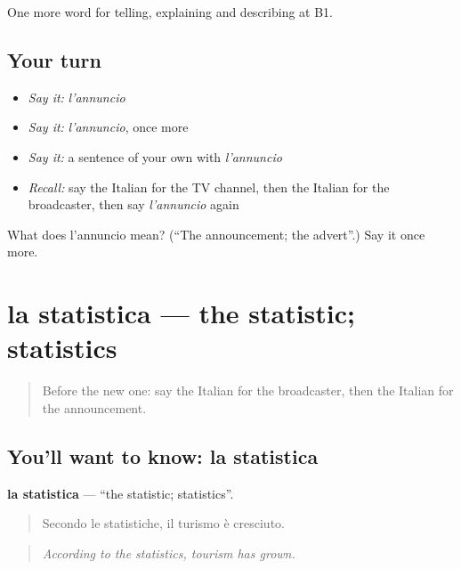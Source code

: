 \begin{grammarlens}[title={What you've built}]
One more word for telling, explaining and describing at B1.
\end{grammarlens}

\subsection*{Your turn}
\begin{itemize}
\raggedright
  \item \emph{Say it:} \emph{l'annuncio}
  \item \emph{Say it:} \emph{l'annuncio}, once more
  \item \emph{Say it:} a sentence of your own with \emph{l'annuncio}
  \item \emph{Recall:} say the Italian for the TV channel, then the Italian for the broadcaster, then say \emph{l'annuncio} again
\end{itemize}

\begin{tcolorbox}[breakable,colback=teal!4,colframe=teal!35!black,title={Before you move on}]
What does l'annuncio mean? (\textquotedblleft{}The announcement; the advert\textquotedblright{}.) Say it once more.
\end{tcolorbox}
\section[la statistica]{la statistica — the statistic; statistics}

\label{lesson:IT-C288-statistica}



\begin{quote}
Before the new one: say the Italian for the broadcaster, then the Italian for the announcement.
\end{quote}

\subsection*{You'll want to know: la statistica}
\textbf{la statistica} — \textquotedblleft{}the statistic; statistics\textquotedblright{}.

\begin{quote}
Secondo le statistiche, il turismo è cresciuto.
\end{quote}

\begin{quote}
\emph{According to the statistics, tourism has grown.}
\end{quote}

